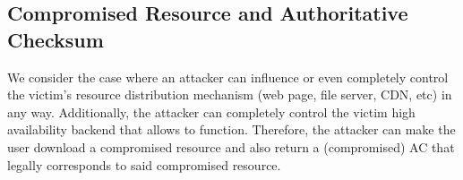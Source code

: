 \subsection{Compromised Resource and Authoritative Checksum}

We consider the case where an attacker can influence or even completely control
the victim's resource distribution mechanism (web page, file server, CDN, etc)
in any way. Additionally, the attacker can completely control the victim high
availability backend that allows \SYSTEM{} to function. Therefore, the attacker can
make the user download a compromised resource and also return a (compromised) AC
that legally corresponds to said compromised resource. 
